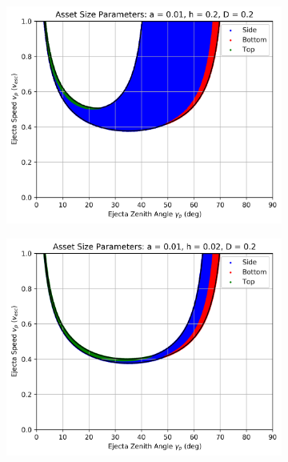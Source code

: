 \documentclass{article}
\begin{document}
\begin{figure}
	
	\begin{subfigure}[t]{.32\textwidth}
		\centering
		\includegraphics[width=.98\linewidth]{asset_speed_zenith_plot_1.100e+00_1.000e-02_2.000e-01_2.000e-01.png}  
		\label{fig:sub-asset_speed_zenith_h2_7}
	\end{subfigure}
	\begin{subfigure}[t]{.32\textwidth}
		\centering
		\includegraphics[width=.98\linewidth]{asset_speed_zenith_plot_1.100e+00_1.000e-02_2.000e-02_2.000e-01.png}  
		\label{fig:sub-asset_speed_zenith_h2_8}
	\end{subfigure}

\end{figure}
\end{document}
